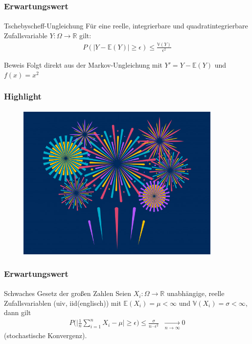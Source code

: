 \documentclass{beamer}
\begin{document}
\begin{frame}
    \frametitle{Erwartungswert}
\framesubtitle{}
\begin{block}{Tschebyscheff-Ungleichung}
Für eine reelle, integrierbare und quadratintegrierbare  Zufallsvariable $Y : \Omega \to \mathbb{R}$  gilt:
\begin{align*}
P (|Y  - \mathbb{E} (Y)|  \geq \epsilon) \leq \frac{\mathbb{V} (Y)}{ \epsilon^2} 
\end{align*}
\end{block}
\begin{block}{Beweis}
Folgt direkt aus der Markov-Ungleichung mit $Y' = Y -\mathbb{E}(Y)$ und $f(x) = x^2$
\end{block}
 \end{frame}


\begin{frame}
    \frametitle{Highlight}
\framesubtitle{}
\begin{figure}[htp]
      \centering
    \includegraphics[width=0.9\textwidth]{img/firework}
\end{figure}
 \end{frame}


\begin{frame}
    \frametitle{Erwartungswert}
\framesubtitle{}
\begin{block}{Schwaches Gesetz der großen Zahlen}
Seien $X_i : \Omega \to \mathbb{R}$ unabhängige, reelle Zufallsvariablen (uiv, iid(englisch)) mit $\mathbb{E}(X_i) = \mu < \infty$ und $\mathbb{V}(X_i) = \sigma < \infty$, dann gilt
\begin{align*}
P \bigl ( \bigl | \frac{1}{n} \sum_{i=1}^{n} X_i - \mu \bigr |  \geq \epsilon \bigr ) \leq \frac{\sigma}{ n \cdot \epsilon^2} \; \; \underset{n \to \infty}{\longrightarrow} 0
\end{align*}
(stochastische Konvergenz). 
\end{block}
 \end{frame}
\end{document}
